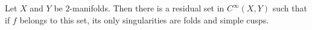 Let $X$ and $Y$ be $2$-manifolds. Then there is a residual set in $C^{\infty}(X, Y)$ such that if $f$ belongs to this set, its only singularities are folds and simple cusps.
